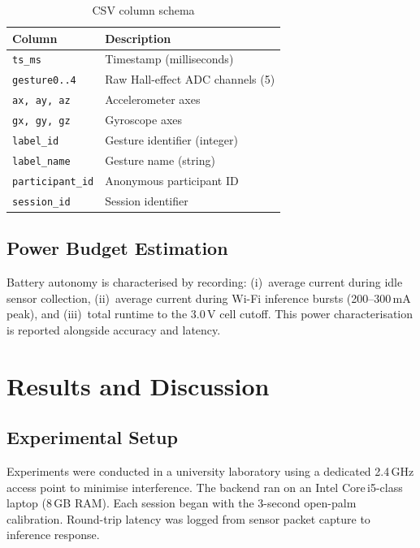 \documentclass[conference]{IEEEtran}
\begin{document}
\begin{table}[!t]
  \centering\caption{CSV column schema}\label{tab:csvschema}
  \begin{tabularx}{\columnwidth}{@{}lX@{}}
    \toprule Column & Description \\\midrule
    \texttt{ts\_ms}          & Timestamp (milliseconds) \\
    \texttt{gesture0..4}     & Raw Hall-effect ADC channels (5) \\
    \texttt{ax, ay, az}      & Accelerometer axes \\
    \texttt{gx, gy, gz}      & Gyroscope axes \\
    \texttt{label\_id}       & Gesture identifier (integer) \\
    \texttt{label\_name}     & Gesture name (string) \\
    \texttt{participant\_id} & Anonymous participant ID \\
    \texttt{session\_id}     & Session identifier \\
    \bottomrule
  \end{tabularx}
\end{table}

\subsection{Power Budget Estimation}

Battery autonomy is characterised by recording: (i)~average current during
idle sensor collection, (ii)~average current during Wi-Fi inference bursts
(200--300\,mA peak), and (iii)~total runtime to the 3.0\,V cell cutoff.
This power characterisation is reported alongside accuracy and latency.

\section{Results and Discussion}

\subsection{Experimental Setup}

Experiments were conducted in a university laboratory using a dedicated 2.4\,GHz
access point to minimise interference. The backend ran on an Intel Core\,i5-class
laptop (8\,GB RAM). Each session began with the 3-second open-palm calibration.
Round-trip latency was logged from sensor packet capture to inference response.
\end{document}
